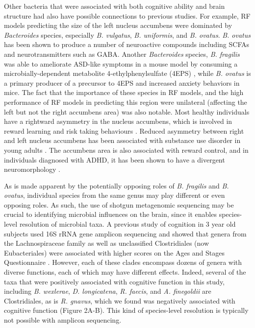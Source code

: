 \documentclass{article}
\begin{document}
Other bacteria that were associated with both cognitive ability and
brain structure had also have possible connections to previous studies.
For example, RF models predicting the size of the left nucleus accumbens
were dominated by \textit{Bacteroides} species,
especially \textit{B. vulgatus}, \textit{B. uniformis}, and \textit{B. ovatus}.
\textit{B. ovatus} has been shown to produce
a number of neuroactive compounds including SCFAs and neurotransmitters
such as GABA\cite{horvathBacteroidesOvatusColonization2022}.
Another \textit{Bacteroides} species, \textit{B. fragilis} was
able to ameliorate ASD-like symptoms in a mouse model
by consuming a microbially-dependent metabolite 4-ethylphenylsulfate (4EPS)
\cite{hsiaoMicrobiotaModulateBehavioral2013},
while \textit{B. ovatus} is a primary producer of a precursor to 4EPS
\cite{needhamGutderivedMetaboliteAlters2022} and increased anxiety
behaviors in mice.
The fact that the importance of these species in RF models,
and the high performance of RF models in predicting this region
were unilateral (affecting the left but not the right accumbens area)
was also notable. Most healthy individuals have a
rightward asymmetry in the nucleus accumbens,
which is involved in reward learning and risk taking behaviours
\cite{ernstAmygdalaNucleusAccumbens2005,yauNucleusAccumbensResponse2012}.
Reduced asymmetry between right and left nucleus accumbens
has been associated with substance use disorder in young adults
\cite{caoMappingCorticalSubcortical2021}. The accumbens area is also
associated with reward control, and in individuals diagnosed with ADHD,
it has been shown to have a divergent neuromorphology
\cite{hoogmanSubcorticalBrainVolume2017}.

As is made apparent by the potentially opposing roles of 
\textit{B. fragilis} and \textit{B. ovatus},
individual species from the same genus may play different
or even opposing roles. As such, the use of shotgun metagenomic sequencing
may be crucial to identifying microbial influences on the brain,
since it enables species-level resolution of microbial taxa.
A previous study of
cognition in 3 year old subjects used 16S rRNA gene amplicon sequencing
and showed that genera from the Lachnospiraceae family as well as
unclassified Clostridiales (now Eubacteriales) were associated with
higher scores on the Ages and Stages Questionnaire
\cite{sordilloAssociationInfantGut2019}.
However, each of these clades encompass dozens of genera with
diverse functions, each of which may have different effects. Indeed,
several of the taxa that were positively associated with cognitive
function in this study, including \emph{B. wexlerae}, \emph{D.
longicatena}, \emph{R. faecis}, and \emph{A. finegoldii} are
Clostridiales, as is \emph{R. gnavus}, which we found was negatively
associated with cognitive function (Figure 2A-B). This kind of
species-level resolution is typically not possible with amplicon
sequencing.
\end{document}

